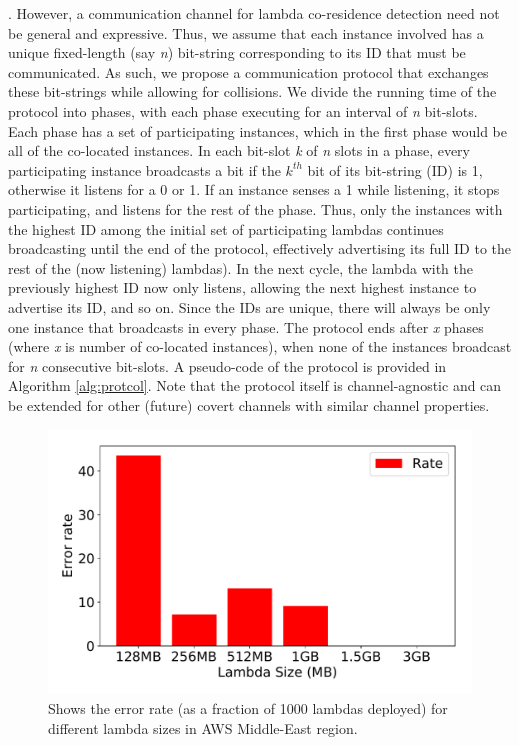 .
However, a communication channel for lambda co-residence detection need not be
general and expressive.  Thus, we assume that each instance
involved has a unique fixed-length (say \emph{n}) bit-string corresponding to
its ID that must be communicated.  As such, we propose a communication protocol
that exchanges these bit-strings while allowing for collisions. We divide the
running time of the protocol into phases, with each phase executing for an
interval of \textit{n} bit-slots. Each phase has a set of participating
instances, which in the first phase would be all of the co-located instances. In
each bit-slot \textit{k} of \textit{n} slots in a phase, every participating
instance broadcasts a bit if the $k^{th}$ bit of its bit-string (ID) is 1,
otherwise it listens for a 0 or 1. If an instance senses a 1 while listening, it
stops participating, and listens for the rest of the phase. Thus, only the
instances with the highest ID among the initial set of participating lambdas
continues broadcasting until the end of the protocol, effectively advertising
its full ID to the rest of the (now listening) lambdas). In the next cycle, the
lambda with the previously highest ID now only listens, allowing the next
highest instance to advertise its ID, and so on.  Since the IDs are unique,
there will always be only one instance that broadcasts in every phase. The
protocol ends after \textit{x} phases (where \textit{x} is number of co-located
instances), when none of the instances broadcast for \textit{n} consecutive
bit-slots.  A pseudo-code of the protocol is provided in Algorithm
\ref{alg:protcol}. Note that the protocol itself is channel-agnostic and can be
extended for other (future) covert channels with similar channel properties.

\begin{figure}[!t]
  \includegraphics[width=.99\linewidth]{fig/errorrates.pdf}
  \caption{Shows the error rate (as a fraction of 1000 lambdas deployed) for different lambda sizes in AWS Middle-East region. 
\label{fig:errorrates}}
\end{figure}

